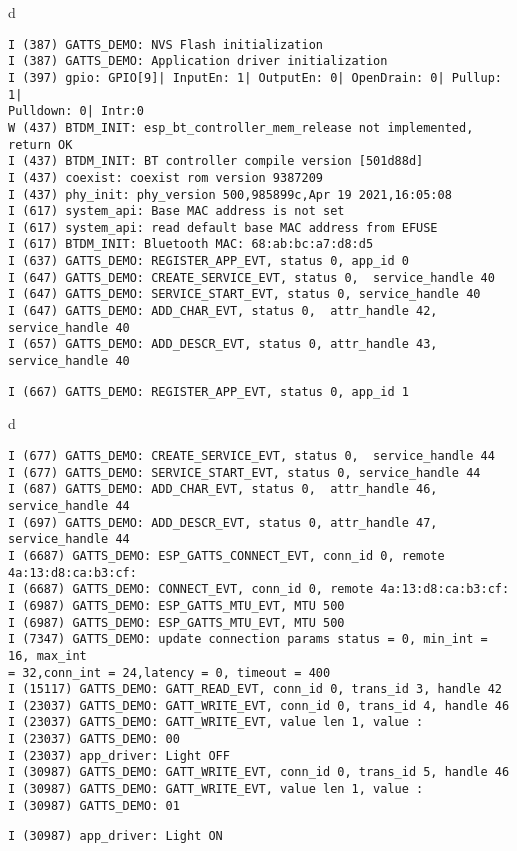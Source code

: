\documentclass[a4paper,12pt]{book}
\begin{document}
\begin{codebloc}
\begin{tabular}{d}
\vspace{2pt}
\begin{verbatim}
I (387) GATTS_DEMO: NVS Flash initialization
I (387) GATTS_DEMO: Application driver initialization
I (397) gpio: GPIO[9]| InputEn: 1| OutputEn: 0| OpenDrain: 0| Pullup: 1|
Pulldown: 0| Intr:0
W (437) BTDM_INIT: esp_bt_controller_mem_release not implemented, return OK
I (437) BTDM_INIT: BT controller compile version [501d88d]
I (437) coexist: coexist rom version 9387209
I (437) phy_init: phy_version 500,985899c,Apr 19 2021,16:05:08
I (617) system_api: Base MAC address is not set
I (617) system_api: read default base MAC address from EFUSE
I (617) BTDM_INIT: Bluetooth MAC: 68:ab:bc:a7:d8:d5
I (637) GATTS_DEMO: REGISTER_APP_EVT, status 0, app_id 0
I (647) GATTS_DEMO: CREATE_SERVICE_EVT, status 0,  service_handle 40
I (647) GATTS_DEMO: SERVICE_START_EVT, status 0, service_handle 40
I (647) GATTS_DEMO: ADD_CHAR_EVT, status 0,  attr_handle 42, service_handle 40
I (657) GATTS_DEMO: ADD_DESCR_EVT, status 0, attr_handle 43, service_handle 40
\end{verbatim}
\verb|I (667) GATTS_DEMO: REGISTER_APP_EVT, status 0, app_id 1|
\end{tabular}
\end{codebloc}

\begin{codebloc}
\begin{tabular}{d}
\vspace{2pt}
\begin{verbatim}
I (677) GATTS_DEMO: CREATE_SERVICE_EVT, status 0,  service_handle 44
I (677) GATTS_DEMO: SERVICE_START_EVT, status 0, service_handle 44
I (687) GATTS_DEMO: ADD_CHAR_EVT, status 0,  attr_handle 46, service_handle 44
I (697) GATTS_DEMO: ADD_DESCR_EVT, status 0, attr_handle 47, service_handle 44
I (6687) GATTS_DEMO: ESP_GATTS_CONNECT_EVT, conn_id 0, remote 4a:13:d8:ca:b3:cf:
I (6687) GATTS_DEMO: CONNECT_EVT, conn_id 0, remote 4a:13:d8:ca:b3:cf:
I (6987) GATTS_DEMO: ESP_GATTS_MTU_EVT, MTU 500
I (6987) GATTS_DEMO: ESP_GATTS_MTU_EVT, MTU 500
I (7347) GATTS_DEMO: update connection params status = 0, min_int = 16, max_int
= 32,conn_int = 24,latency = 0, timeout = 400
I (15117) GATTS_DEMO: GATT_READ_EVT, conn_id 0, trans_id 3, handle 42
I (23037) GATTS_DEMO: GATT_WRITE_EVT, conn_id 0, trans_id 4, handle 46
I (23037) GATTS_DEMO: GATT_WRITE_EVT, value len 1, value :
I (23037) GATTS_DEMO: 00 
I (23037) app_driver: Light OFF
I (30987) GATTS_DEMO: GATT_WRITE_EVT, conn_id 0, trans_id 5, handle 46
I (30987) GATTS_DEMO: GATT_WRITE_EVT, value len 1, value :
I (30987) GATTS_DEMO: 01 
\end{verbatim}
\verb|I (30987) app_driver: Light ON|
\end{tabular}
\end{codebloc}
\end{document}
